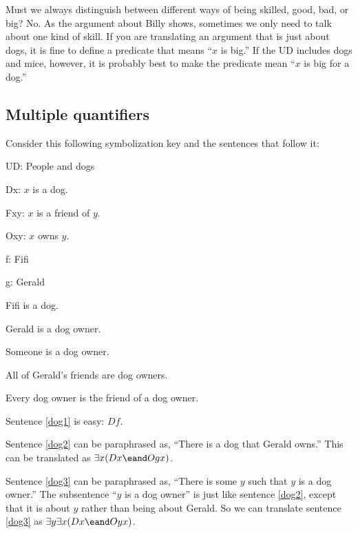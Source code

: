 Must we always distinguish between different ways of being skilled, good, bad, or big? No. As the argument about Billy shows, sometimes we only need to talk about one kind of skill. If you are translating an argument that is just about dogs, it is fine to define a predicate that means ``$x$ is big.'' If the UD includes dogs and mice, however, it is probably best to make the predicate mean ``$x$ is big for a dog.''


\subsection{Multiple quantifiers}


Consider this following symbolization key and the sentences that follow it:
\begin{description}
\item{UD:} People and dogs
\item{Dx:} $x$ is a dog.
\item{Fxy:} $x$ is a friend of $y$.
\item{Oxy:} $x$ owns $y$.
\item{f:} Fifi
\item{g:} Gerald
\end{description}

\begin{kormanize}
\item[\ex{dog1}] Fifi is a dog.
\item[\ex{dog2}] Gerald is a dog owner.
\item[\ex{dog3}] Someone is a dog owner.
\item[\ex{dog4}] All of Gerald's friends are dog owners.
\item[\ex{dog5}] Every dog owner is the friend of a dog owner.
\end{kormanize}

Sentence \ref{dog1} is easy: $Df$.

Sentence \ref{dog2} can be paraphrased as, ``There is a dog that Gerald owns.'' This can be translated as $\exists x(Dx \eand Ogx)$.

Sentence \ref{dog3} can be paraphrased as, ``There is some $y$ such that $y$ is a dog owner.'' The subsentence ``$y$ is a dog owner'' is just like sentence \ref{dog2}, except that it is about $y$ rather than being about Gerald. So we can translate sentence \ref{dog3} as $\exists y \exists x(Dx \eand Oyx)$. 

